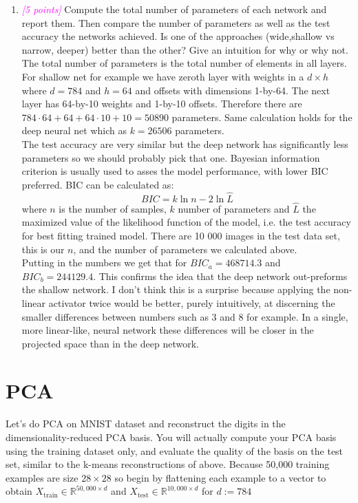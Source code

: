 \documentclass{article}
\newcommand{\field}[1]{\mathbb{#1}}
\newcommand{\1}{\mathbf{1}}
\newcommand{\R}{\field{R}} %
\newcommand{\points}[1]{\small\textcolor{magenta}{\emph{[#1 points]}} \normalsize}
\begin{document}
\begin{enumerate}
     \item \points{5} Compute the total number of parameters of each network and report them. Then compare the number of parameters as well as the test accuracy the networks achieved. Is one of the approaches (wide,shallow vs narrow, deeper) better than the other? Give an intuition for why or why not. \\
     The total number of parameters is the total number of elements in all layers. For shallow net for example we have zeroth layer with weights in a $d\times h$ where $d=784$ and $h=64$ and offsets with dimensions 1-by-64. The next layer has 64-by-10 weights and 1-by-10 offsets. Therefore there are $784\cdot 64 + 64 + 64\cdot 10 + 10=50890$ parameters. Same calculation holds for the deep neural net which as $k=26506$ parameters. \\
     
     The test accuracy are very similar but the deep network has significantly less parameters so we should probably pick that one. Bayesian information criterion is usually used to asses the model performance, with lower BIC preferred. BIC can be calculated as:
     $$ BIC = k\ln{n} - 2\ln{\widehat L}$$
     where $n$ is the number of samples, $k$ number of parameters and $\widehat L$ the maximized value of the likelihood function of the model, i.e. the test accuracy for best fitting trained model. There are 10 000 images in the test data set, this is our $n$, and the number of parameters we calculated above. \\
     Putting in the numbers we get that for $BIC_a = 468714.3$ and $BIC_b=244129.4$. This confirms the idea that the deep network out-preforms the shallow network. I don't think this is a surprise because applying the non-linear activator twice would be better, purely intuitively, at discerning  the smaller differences between numbers such as 3 and 8 for example. In a single, more linear-like, neural network these differences will be closer in the projected space than in the deep network. 
\end{enumerate}
\newpage





\newpage
\section*{PCA}

Let’s do PCA on MNIST dataset and reconstruct the digits in the dimensionality-reduced PCA basis. You will actually compute your PCA basis using the training dataset only, and evaluate the quality of the basis on the  test set, similar to the k-means reconstructions of above. Because 50,000 training examples are size $28\times 28$ so begin by flattening each example to a vector to obtain $X_{\text{train}} \in \R^{50,000 \times d}$ and $X_{\text{test}} \in \R^{10,000\times d}$ for $d:=784$
\end{document}

